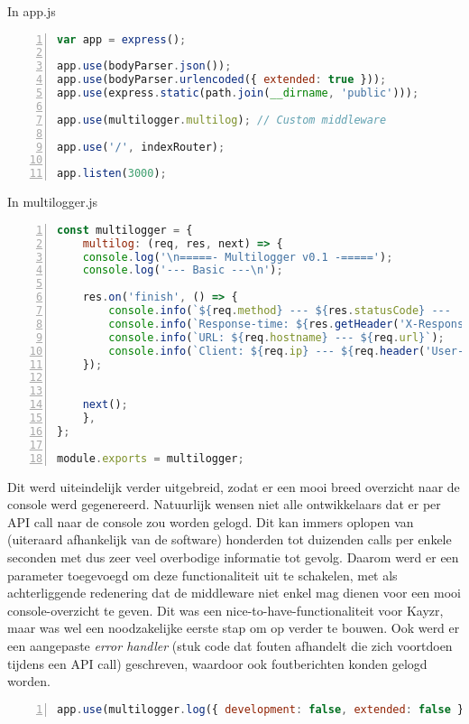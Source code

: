 In app.js
\begin{lstlisting}[language=JavaScript, breaklines=true, numbers=left, frame=single, caption={app.js eerste stap},label=code:appjsFirst]
var app = express();

app.use(bodyParser.json());
app.use(bodyParser.urlencoded({ extended: true }));
app.use(express.static(path.join(__dirname, 'public')));

app.use(multilogger.multilog); // Custom middleware

app.use('/', indexRouter);

app.listen(3000);
\end{lstlisting}

In multilogger.js
\begin{lstlisting}[language=JavaScript, breaklines=true, numbers=left, frame=single, caption={multilogger.js eerste stap},label=code:multilogFirst]
const multilogger = {
	multilog: (req, res, next) => {
	console.log('\n=====- Multilogger v0.1 -=====');
	console.log('--- Basic ---\n');
	
	res.on('finish', () => {
		console.info(`${req.method} --- ${res.statusCode} ---  ${res.statusMessage}  at ${new Date().toLocaleString()}`);
		console.info(`Response-time: ${res.getHeader('X-Response-Time')}`);
		console.info(`URL: ${req.hostname} --- ${req.url}`);
		console.info(`Client: ${req.ip} --- ${req.header('User-Agent')}`);
	});
	

	next();
	},
};

module.exports = multilogger; 
\end{lstlisting}

Dit werd uiteindelijk verder uitgebreid, zodat er een mooi breed overzicht naar de console werd gegenereerd. Natuurlijk wensen niet alle ontwikkelaars dat er per API call naar de console zou worden gelogd. Dit kan immers oplopen van (uiteraard afhankelijk van de software) honderden tot duizenden calls per enkele seconden met dus zeer veel overbodige informatie tot gevolg. Daarom werd er een parameter toegevoegd om deze functionaliteit uit te schakelen, met als achterliggende redenering dat de middleware niet enkel mag dienen voor een mooi console-overzicht te geven. Dit was een nice-to-have-functionaliteit voor Kayzr, maar was wel  een noodzakelijke eerste stap om op verder te bouwen. Ook werd er een aangepaste \textit{error handler} (stuk code dat fouten afhandelt die zich voortdoen tijdens een API call) geschreven, waardoor ook foutberichten konden gelogd worden.

\begin{lstlisting}[language=JavaScript, breaklines=true, numbers=left, frame=single, caption={Parameters toegevoegd},label=code:multilogparams]
app.use(multilogger.log({ development: false, extended: false }));
\end{lstlisting}

